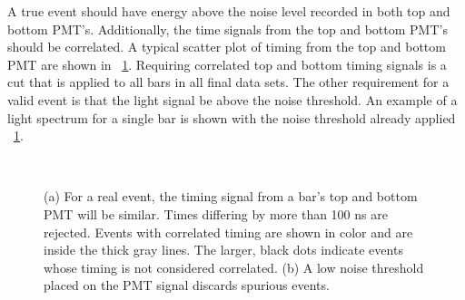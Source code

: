 A true event should have energy above the noise level recorded in both top and bottom PMT's.  Additionally, the time signals from the top and bottom PMT's should be correlated.  A typical scatter plot of timing from the top and bottom PMT are shown in {\fig}~\ref{fig:realEvent}.  Requiring correlated top and bottom timing signals is a cut that is applied to all bars in all final data sets.  The other requirement for a valid event is that the light signal be above the noise threshold.  An example of a light spectrum for a single bar is shown with the noise threshold already applied {\fig}~\ref{fig:realEvent}.
\begin{figure}[!htbp]
\centering
{}\\
\caption[Cuts used to determine event validity include timing correlation and a light signal above the noise threshold.]{(a) For a real event, the timing signal from a bar's top and bottom PMT will be similar.  Times differing by more than 100 ns are rejected.  Events with correlated timing are shown in color and are inside the thick gray lines.  The larger, black dots indicate events whose timing is not considered correlated.  (b) A low noise threshold placed on the PMT signal discards spurious events.}
\label{fig:realEvent}
\end{figure}

